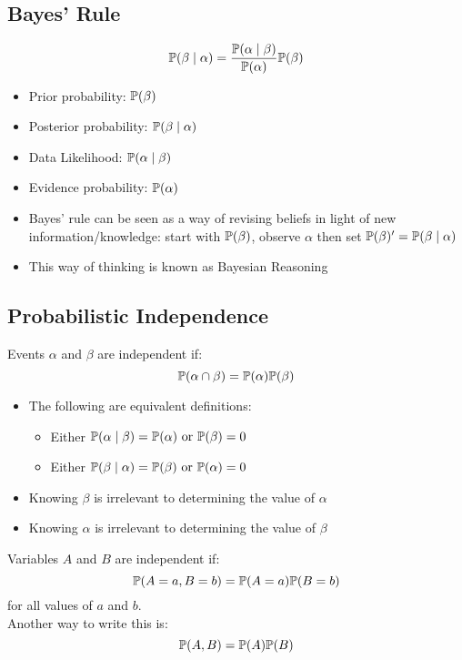 \subsection{Bayes' Rule}
	\begin{frame}
		\[ \P( \beta \mid \alpha ) = \frac{\P( \alpha \mid \beta )}{\P( \alpha )} \P( \beta ) \]
		\begin{itemize}
			\item Prior probability: $\P( \beta )$
			\item Posterior probability: $\P( \beta \mid \alpha )$
			\item Data Likelihood: $\P( \alpha \mid \beta )$
			\item Evidence probability: $\P( \alpha )$
		\end{itemize}
		\begin{itemize}
			\item Bayes' rule can be seen as a way of \alert{revising beliefs} in light of new information/knowledge: start with $\P( \beta )$, observe $\alpha$ then set $\P( \beta )' = \P( \beta \mid \alpha )$
			\item This way of thinking is known as \alert{Bayesian Reasoning}
		\end{itemize}
	\end{frame}

\subsection{Probabilistic Independence}
	\begin{frame}
		Events $\alpha$ and $\beta$ are independent if:
			\[ \P( \alpha \cap \beta ) = \P( \alpha ) \P( \beta ) \]
		\begin{itemize}
			\item The following are equivalent definitions:
			\begin{itemize}
				\item Either $\P( \alpha \mid \beta ) = \P( \alpha ) \text{ or } \P( \beta ) = 0$
				\item Either $\P( \beta \mid \alpha ) = \P( \beta ) \text{ or } \P( \alpha ) = 0$
			\end{itemize}
			\item Knowing $\beta$ is irrelevant to determining the value of $\alpha$
			\item Knowing $\alpha$ is irrelevant to determining the value of $\beta$
		\end{itemize}
	\end{frame}
	\begin{frame}
		Variables $A$ and $B$ are independent if:
			\[ \P( A = a , B = b ) = \P( A = a ) \P( B = b ) \]
		for all values of $a$ and $b$.\\
		Another way to write this is:
			\[ \P( A , B ) = \P( A ) \P( B ) \]
	\end{frame}

